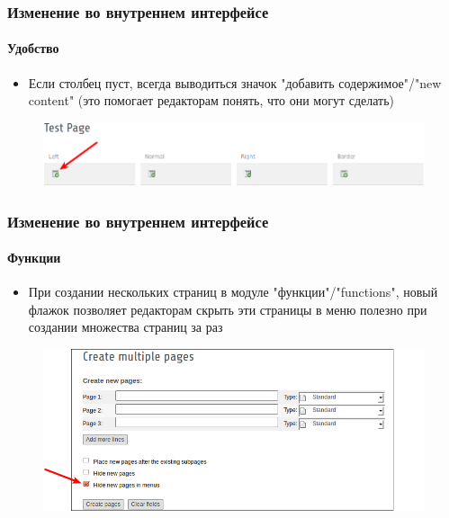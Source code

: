 
\begin{frame}[fragile]
	\frametitle{Изменение во внутреннем интерфейсе}
	\framesubtitle{Удобство}

 	\begin{itemize}
		\item Если столбец пуст, всегда выводиться значок "добавить содержимое"/"new content"\newline
			\small(это помогает редакторам понять, что они могут сделать)\normalsize
	\end{itemize}

	\begin{figure}
		\includegraphics[width=0.95\linewidth]{Images/BackendChanges/NewContentIconAlwaysVisible.png}
	\end{figure}

\end{frame}


\begin{frame}[fragile]
	\frametitle{Изменение во внутреннем интерфейсе}
	\framesubtitle{Функции}

    \begin{itemize}
		\item При создании нескольких страниц в модуле "функции"/"functions", новый флажок позволяет редакторам скрыть
		эти страницы в меню
		 полезно при создании множества страниц за раз\normalsize
	\end{itemize}

	\begin{figure}
		\includegraphics[width=0.85\linewidth]{Images/BackendChanges/CreateMultiplePagesHideInMenu.png}
	\end{figure}

\end{frame}

